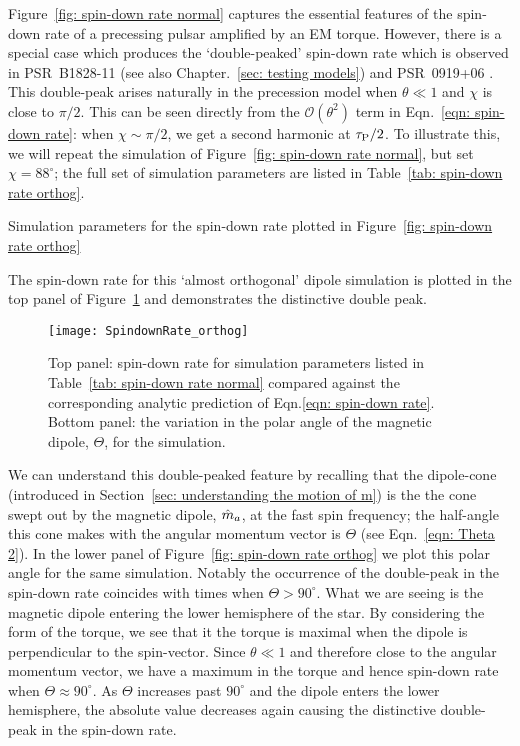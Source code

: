 \documentclass[../full_thesis/full_thesis.tex]{subfiles}
\newcommand{\thisdir}{../inertial_frame}
\begin{document}
Figure~\ref{fig: spin-down rate normal} captures the essential features of the
spin-down rate of a precessing pulsar amplified by an EM torque. However, there
is a special case which produces the `double-peaked' spin-down rate which is
observed in PSR~B1828-11 \citep{Lyne2010} (see also Chapter.~\ref{sec: testing
models}) and PSR~0919+06 \citep{Perera2015}.  This double-peak arises naturally
in the precession model when $\theta \ll 1$ and $\chi$ is close to $\pi/2$.
This can be seen directly from the $\mathcal{O}(\theta^{2})$ term in
Eqn.~\eqref{eqn: spin-down rate}: when $\chi \sim \pi/2$, we get a second
harmonic at $\tau_{\mathrm{P}}/2$. To illustrate this, we will repeat the simulation of
Figure~\ref{fig: spin-down rate normal}, but set $\chi=88^{\circ}$; the full
set of simulation parameters are listed in Table~\ref{tab: spin-down rate
orthog}.
\begin{table}[htb]
\centering

\caption{Simulation parameters for the spin-down rate plotted in Figure~\ref{fig:
spin-down rate orthog}}
\label{tab: spin-down rate orthog}
\end{table}
The spin-down rate for this `almost orthogonal' dipole simulation is plotted
in the top panel of Figure~\ref{fig: spin-down rate orthog} and demonstrates the
distinctive double peak.
\begin{figure}[htb]
\centering
\texttt{[image: SpindownRate\_orthog]}
\caption{Top panel: spin-down rate for simulation parameters listed in Table~\ref{tab:
spin-down rate normal} compared against the corresponding analytic prediction
of Eqn.\eqref{eqn: spin-down rate}. Bottom panel: the variation in the polar
angle of the magnetic dipole, $\Theta$, for the simulation.}
\label{fig: spin-down rate orthog}
\end{figure}

We can understand this double-peaked feature by recalling that the dipole-cone
(introduced in Section~\ref{sec: understanding the motion of m}) is the the
cone swept out by the magnetic dipole, $\hat{m}_a$, at the fast spin frequency; the
half-angle this cone makes with the angular momentum vector is $\Theta$ (see
Eqn.~\eqref{eqn: Theta 2}).  In the lower panel of Figure~\ref{fig: spin-down
rate orthog} we plot this polar angle for the same simulation. Notably the
occurrence of the double-peak in the spin-down rate coincides with times when
$\Theta > 90^{\circ}$. What we are seeing is the magnetic dipole entering the
lower hemisphere of the star. By considering the form of the
\citet{Deutsch1955} torque, we see that it the torque is maximal when the
dipole is perpendicular to the spin-vector. Since $\theta \ll 1$ and therefore
close to the angular momentum vector, we have a maximum in the torque and hence
spin-down rate when $\Theta \approx 90^{\circ}$. As $\Theta$ increases past
$90^{\circ}$ and the dipole enters the lower hemisphere, the absolute value
decreases again causing the distinctive double-peak in the spin-down rate.
\end{document}
